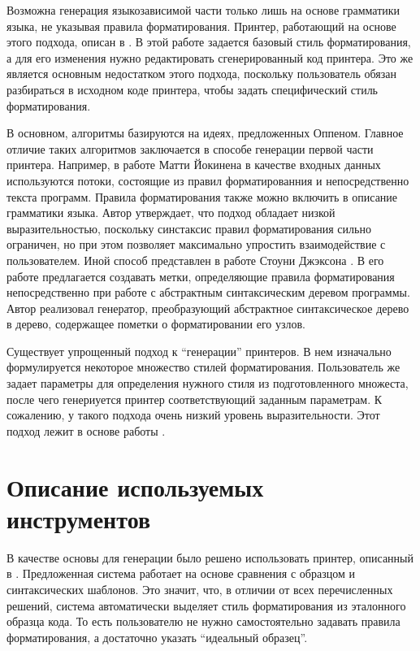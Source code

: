 \documentclass{matmex-diploma}
\begin{document}
Возможна генерация языкозависимой части только лишь на основе грамматики языка, не указывая правила форматирования. Принтер, работающий на основе этого подхода, описан в \cite{oppenlike:brand}. В этой работе задается базовый стиль форматирования, а для его изменения нужно редактировать сгенерированный код принтера. Это же является основным недостатком этого подхода, поскольку пользователь обязан разбираться в исходном коде принтера, чтобы задать специфический стиль форматирования.

В основном, алгоритмы \cite{jonge, jokinen, jackson} базируются на идеях, предложенных Оппеном. Главное отличие таких алгоритмов заключается в способе генерации первой части принтера. Например, в работе Матти Йокинена \cite{jokinen} в качестве входных данных используются потоки, состоящие из правил форматированния и непосредственно текста программ. Правила форматирования также можно включить в описание грамматики языка. Автор утверждает, что подход обладает низкой выразительностью, поскольку синстаксис правил форматирования сильно ограничен, но при этом позволяет максимально упростить взаимодействие с пользователем. Иной способ представлен в работе Стоуни Джэксона \cite{jackson}. В его работе предлагается создавать метки, определяющие правила форматирования непосредственно при работе с абстрактным синтаксическим деревом программы. Автор реализовал генератор, преобразующий абстрактное синтаксическое дерево в дерево, содержащее пометки о форматировании его узлов.

Существует упрощенный подход к “генерации” принтеров. В нем изначально формулируется некоторое множество стилей форматирования. Пользователь же задает параметры для определения нужного стиля из подготовленного множеста, после чего генериуется принтер соответствующий заданным параметрам. К сожалению, у такого подхода очень низкий уровень выразительности. Этот подход лежит в основе работы \cite{blaschek}.

\section{Описание используемых инструментов}
В качестве основы для генерации было решено использовать принтер, описанный в \cite{podkopaev:diploma}. Предложенная система работает на основе сравнения с образцом и синтаксических шаблонов. Это значит, что, в отличии от всех перечисленных решений, система автоматически выделяет стиль форматирования из эталонного образца кода. То есть пользователю не нужно самостоятельно задавать правила форматирования, а достаточно указать “идеальный образец”. 
\end{document}
